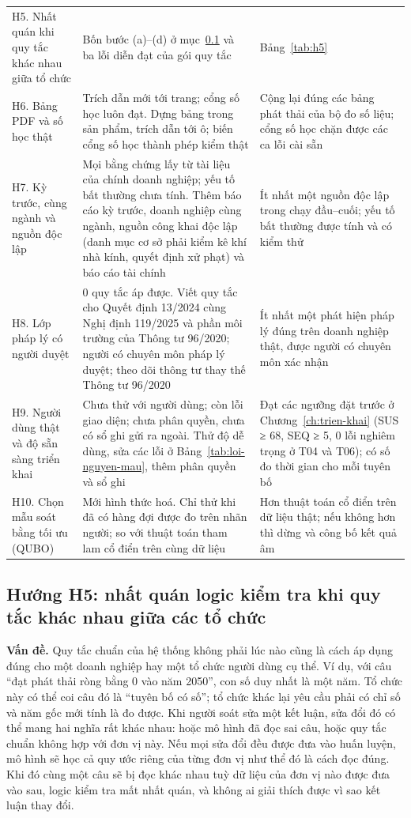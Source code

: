 {\begin{xltabular}{\linewidth}{L{2.6cm}YL{4.6cm}}
H5. Nhất quán khi quy tắc khác nhau giữa tổ chức & Bốn bước (a)–(d) ở mục~\ref{sec:h5} và ba lỗi diễn đạt của gói quy tắc & Bảng~\ref{tab:h5}\\
H6. Bảng PDF và số học thật & Trích dẫn mới tới trang; cổng số học luôn đạt. Dựng bảng trong sản phẩm, trích dẫn tới ô; biến cổng số học thành phép kiểm thật & Cộng lại đúng các bảng phát thải của bộ đo số liệu; cổng số học chặn được các ca lỗi cài sẵn\\
H7. Kỳ trước, cùng ngành và nguồn độc lập & Mọi bằng chứng lấy từ tài liệu của chính doanh nghiệp; yếu tố bất thường chưa tính. Thêm báo cáo kỳ trước, doanh nghiệp cùng ngành, nguồn công khai độc lập (danh mục cơ sở phải kiểm kê khí nhà kính, quyết định xử phạt) và báo cáo tài chính & Ít nhất một nguồn độc lập trong chạy đầu–cuối; yếu tố bất thường được tính và có kiểm thử\\
H8. Lớp pháp lý có người duyệt & 0 quy tắc áp được. Viết quy tắc cho Quyết định 13/2024 cùng Nghị định 119/2025 và phần môi trường của Thông tư 96/2020; người có chuyên môn pháp lý duyệt; theo dõi thông tư thay thế Thông tư 96/2020 & Ít nhất một phát hiện pháp lý đúng trên doanh nghiệp thật, được người có chuyên môn xác nhận\\
H9. Người dùng thật và độ sẵn sàng triển khai & Chưa thử với người dùng; còn lỗi giao diện; chưa phân quyền, chưa có sổ ghi gửi ra ngoài. Thử độ dễ dùng, sửa các lỗi ở Bảng~\ref{tab:loi-nguyen-mau}, thêm phân quyền và sổ ghi & Đạt các ngưỡng đặt trước ở Chương~\ref{ch:trien-khai} (SUS ≥ 68, SEQ ≥ 5, 0 lỗi nghiêm trọng ở T04 và T06); có số đo thời gian cho mỗi tuyên bố\\
H10. Chọn mẫu soát bằng tối ưu (QUBO) & Mới hình thức hoá. Chỉ thử khi đã có hàng đợi được đo trên nhãn người; so với thuật toán tham lam cổ điển trên cùng dữ liệu & Hơn thuật toán cổ điển trên dữ liệu thật; nếu không hơn thì dừng và công bố kết quả âm\\
\end{xltabular}}

\subsection{Hướng H5: nhất quán logic kiểm tra khi quy tắc khác nhau giữa các tổ chức}\label{sec:h5}

\textbf{Vấn đề.} Quy tắc chuẩn của hệ thống không phải lúc nào cũng là cách áp dụng đúng cho một doanh nghiệp hay một tổ chức người dùng cụ thể. Ví dụ, với câu “đạt phát thải ròng bằng 0 vào năm 2050”, con số duy nhất là một năm. Tổ chức này có thể coi câu đó là “tuyên bố có số”; tổ chức khác lại yêu cầu phải có chỉ số và năm gốc mới tính là đo được. Khi người soát sửa một kết luận, sửa đổi đó có thể mang hai nghĩa rất khác nhau: hoặc mô hình đã đọc sai câu, hoặc quy tắc chuẩn không hợp với đơn vị này. Nếu mọi sửa đổi đều được đưa vào huấn luyện, mô hình sẽ học cả quy ước riêng của từng đơn vị như thể đó là cách đọc đúng. Khi đó cùng một câu sẽ bị đọc khác nhau tuỳ dữ liệu của đơn vị nào được đưa vào sau, logic kiểm tra mất nhất quán, và không ai giải thích được vì sao kết luận thay đổi.

